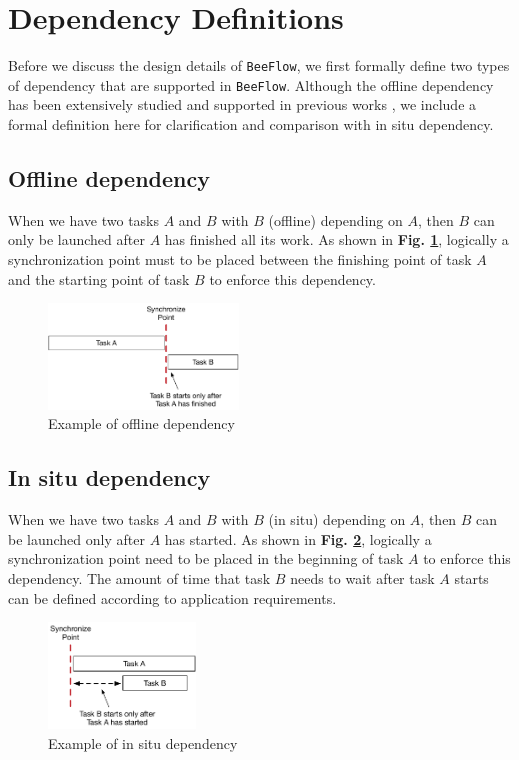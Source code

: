 \section{Dependency Definitions}
Before we discuss the design details of \texttt{BeeFlow}, we first formally define two types of dependency that are supported in \texttt{BeeFlow}. Although the offline dependency has been extensively studied and supported in previous works \cite{liu2015survey, altintas2004kepler, deelman2005pegasus, ogasawara2013chiron, zhao2007swift}, we include a formal definition here for clarification and comparison with in situ dependency. 

\subsection{Offline dependency}
When we have two tasks $A$ and $B$ with $B$ (offline) depending on $A$, then $B$ can only be launched after $A$ has finished all its work. As shown in \textbf{Fig. \ref{offline}}, logically a synchronization point must to be placed between the finishing point of task $A$ and the starting point of task $B$ to enforce this dependency.
\begin{figure}[h]
    \centering
    
    \includegraphics[width=0.45\textwidth]{figures/off-line.pdf}
    \caption{Example of offline dependency}
    \label{offline}
    
\end{figure}

\subsection{In situ dependency}
When we have two tasks $A$ and $B$ with $B$ (in situ) depending on $A$, then $B$ can be launched only after $A$ has started. As shown in \textbf{Fig. \ref{in situ}}, logically a synchronization point need to be placed in the beginning of task $A$ to enforce this dependency. The amount of time that task $B$ needs to wait after task $A$ starts can be defined according to application requirements.
\begin{figure}[h]
    \centering
   
    \includegraphics[width=0.35\textwidth]{figures/in-situ.pdf}
    \caption{Example of in situ dependency}
    \label{in situ}
    
\end{figure}

